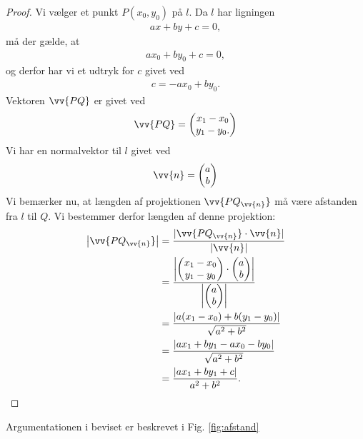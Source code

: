 \begin{proof}
Vi vælger et punkt  $P(x_0,y_0)$ på $l$. Da $l$ har ligningen
\begin{align*}
ax+by+c = 0, 
\end{align*}
må der gælde, at 
\begin{align*}
ax_0+by_0+c = 0, 
\end{align*}
og derfor har vi et udtryk for $c$ givet ved
\begin{align*}
c = -ax_0+by_0.
\end{align*}
Vektoren $\vv{PQ}$ er givet ved
\begin{align*}
\vv{PQ} = \begin{pmatrix}
x_1 - x_0 \\ y_1 - y_0.
\end{pmatrix}
\end{align*}
Vi har en normalvektor til $l$ givet ved 
\begin{align*}
\vv{n}=
\begin{pmatrix}
a \\ b
\end{pmatrix}
\end{align*}
Vi bemærker nu, at længden af projektionen $\vv{PQ_{\vv{n}}}$ må være afstanden fra $l$ til $Q$. Vi bestemmer derfor længden af denne projektion:
\begin{align*}
\left|\vv{PQ_{\vv{n}}}\right| &= \frac{|\vv{PQ_{\vv{n}}}\cdot \vv{n}|}{|\vv{n}|} \\ 
&= \frac{\left|\begin{pmatrix}
x_1-x_0 \\ y_1 - y_0
\end{pmatrix}\cdot \begin{pmatrix}
a \\ b
\end{pmatrix} \right|}{\left|\begin{pmatrix}
a \\ b
\end{pmatrix}\right|}\\
&=\frac{|a(x_1-x_0)+b(y_1-y_0)|}{\sqrt{a^2+b^2}}\\
&= \frac{|ax_1+by_1 -ax_0-by_0|}{\sqrt{a^2+b^2}}\\
&= \frac{|ax_1+by_1+c|}{a^2+b^2}.
\end{align*}
\end{proof}
Argumentationen i beviset er beskrevet i Fig. \ref{fig:afstand}
